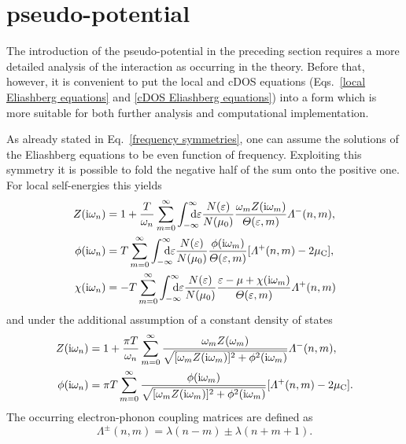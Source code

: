 \section{ pseudo-potential}

The introduction of the  pseudo-potential in the preceding section
requires a more detailed analysis of the  interaction as occurring
in the  theory. Before that, however, it is convenient to put
the local and cDOS  equations (Eqs.~\ref{local Eliashberg
equations} and \ref{cDOS Eliashberg equations}) into a form which is more
suitable for both further analysis and computational implementation.

As already stated in Eq.~\ref{frequency symmetries}, one can assume the
solutions of the Eliashberg equations to be even function of frequency.
Exploiting this symmetry it is possible to fold the negative half of the
 sum onto the positive one. For local self-energies this yields
%
\begin{align*}
    Z(\I \omega_n) &= 1 + \frac T {\omega_n} \sum_{m = 0}^\infty
    \int \from{-\infty} \till \infty \D \epsilon
    \frac{N(\epsilon)}{N(\mu_0)}
    \frac{\omega_m Z(\I \omega_m)}{\Theta(\epsilon, m)}
    \Lambda^-(n, m),
    \\
    \phi(\I \omega_n) &= T \sum_{m = 0}^\infty
    \int \from{-\infty} \till \infty \D \epsilon
    \frac{N(\epsilon)}{N(\mu_0)}
    \frac{\phi(\I \omega_m)}{\Theta(\epsilon, m)}
    [\Lambda^+(n, m) - 2 \mu \sub C],
    \\
    \chi(\I \omega_n) &= -T \sum_{m = 0}^\infty
    \int \from{-\infty} \till \infty \D \epsilon
    \frac{N(\epsilon)}{N(\mu_0)}
    \frac{\epsilon - \mu + \chi(\I \omega_m)}{\Theta(\epsilon, m)}
    \Lambda^+(n, m)
\end{align*}
%
and under the additional assumption of a constant density of states
%
\begin{align*}
    Z(\mathrm i \omega_n) &= 1 + \frac{\pi T}{\omega_n} \sum_{m = 0}^\infty
    \frac
        {\omega_m Z(\omega_m)}
        {\sqrt{[\omega_m Z(\mathrm i \omega_m)]^2 + \phi^2(\mathrm i \omega_m)}}
    \varLambda^-(n, m),
    \\
    \phi(\mathrm i \omega_n) &= \pi T \sum_{m = 0}^\infty
    \frac
        {\phi(\mathrm i \omega_m)}
        {\sqrt{[\omega_m Z(\mathrm i \omega_m)]^2 + \phi^2(\mathrm i \omega_m)}}
    [\varLambda^+(n, m) - 2 \mu \sb{\text{C}}].
\end{align*}
%
The occurring electron-phonon coupling matrices are defined as
%
\begin{equation*}
    \Lambda^\pm(n, m) = \lambda(n - m) \pm \lambda(n + m + 1).
\end{equation*}

